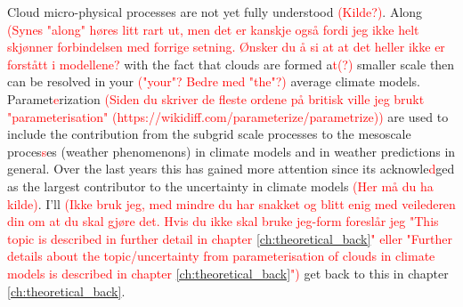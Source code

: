 Cloud micro-physical processes are not yet fully understood \textcolor{red}{(Kilde?)}. Along \textcolor{red}{(Synes "along" høres litt rart ut, men det er kanskje også fordi jeg ikke helt skjønner forbindelsen med forrige setning. Ønsker du å si at at det heller ikke er forstått i modellene? } with the fact that clouds are formed a\textcolor{red}{t(?)} smaller scale then can be resolved in your \textcolor{red}{("your"? Bedre med "the"?)} average climate models. Paramet\textcolor{red}{e}rization \textcolor{red}{(Siden du skriver de fleste ordene på britisk ville jeg brukt "parameterisation" (https://wikidiff.com/parameterize/parametrize))} are used to include the contribution from the subgrid scale processes to the mesoscale proces\textcolor{red}{s}es (weather phenomenons) in climate models and in weather predictions in general. Over the last years this has gained more attention since its acknowle\textcolor{red}{d}ged as the largest contributor to the uncertainty in climate models \textcolor{red}{(Her må du ha kilde)}. I'll \textcolor{red}{(Ikke bruk jeg, med mindre du har snakket og blitt enig med veilederen din om at du skal gjøre det. Hvis du ikke skal bruke jeg-form foreslår jeg "This topic is described in further detail in chapter \ref{ch:theoretical_back}" eller "Further details about the topic/uncertainty from parameterisation of clouds in climate models is described in chapter \ref{ch:theoretical_back}")} get back to this in chapter \ref{ch:theoretical_back}.

